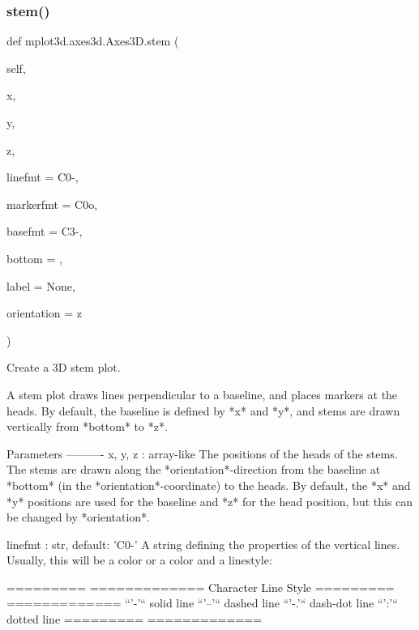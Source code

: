 \begin{DoxyVerb}
\mbox{\label{classmplot3d_1_1axes3d_1_1Axes3D_ae54d9c8a76acf06a9da24106f4e98139}} 
\subsubsection{\texorpdfstring{stem()}{stem()}}
{\footnotesize\ttfamily def mplot3d.\+axes3d.\+Axes3\+D.\+stem (\begin{DoxyParamCaption}\item[{}]{self,  }\item[{}]{x,  }\item[{}]{y,  }\item[{}]{z,  }\item[{}]{linefmt = {\ttfamily \textquotesingle{}C0-\/\textquotesingle{}},  }\item[{}]{markerfmt = {\ttfamily \textquotesingle{}C0o\textquotesingle{}},  }\item[{}]{basefmt = {\ttfamily \textquotesingle{}C3-\/\textquotesingle{}},  }\item[{}]{bottom = {},  }\item[{}]{label = {\ttfamily None},  }\item[{}]{orientation = {\ttfamily \textquotesingle{}z\textquotesingle{}} }\end{DoxyParamCaption})}

\begin{DoxyVerb}Create a 3D stem plot.

A stem plot draws lines perpendicular to a baseline, and places markers
at the heads. By default, the baseline is defined by *x* and *y*, and
stems are drawn vertically from *bottom* to *z*.

Parameters
----------
x, y, z : array-like
    The positions of the heads of the stems. The stems are drawn along
    the *orientation*-direction from the baseline at *bottom* (in the
    *orientation*-coordinate) to the heads. By default, the *x* and *y*
    positions are used for the baseline and *z* for the head position,
    but this can be changed by *orientation*.

linefmt : str, default: 'C0-'
    A string defining the properties of the vertical lines. Usually,
    this will be a color or a color and a linestyle:

    =========  =============
    Character  Line Style
    =========  =============
    ``'-'``    solid line
    ``'--'``   dashed line
    ``'-.'``   dash-dot line
    ``':'``    dotted line
    =========  =============


\end{DoxyVerb}
\end{DoxyVerb}
